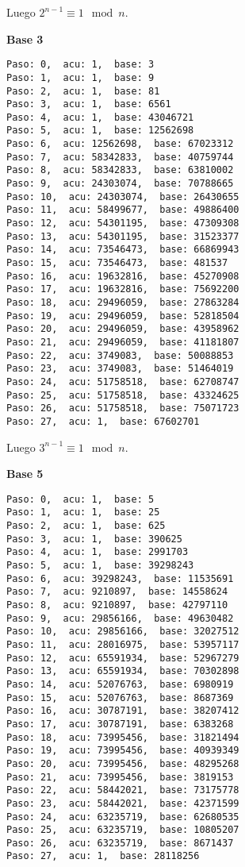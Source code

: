 \documentclass[a4paper]{article}
\begin{document}
Luego $2^{n-1}\equiv 1 \mod n$.


\textbf{Base 3}
\begin{verbatim}
Paso: 0,  acu: 1,  base: 3  
Paso: 1,  acu: 1,  base: 9  
Paso: 2,  acu: 1,  base: 81  
Paso: 3,  acu: 1,  base: 6561  
Paso: 4,  acu: 1,  base: 43046721  
Paso: 5,  acu: 1,  base: 12562698  
Paso: 6,  acu: 12562698,  base: 67023312  
Paso: 7,  acu: 58342833,  base: 40759744  
Paso: 8,  acu: 58342833,  base: 63810002  
Paso: 9,  acu: 24303074,  base: 70788665  
Paso: 10,  acu: 24303074,  base: 26430655  
Paso: 11,  acu: 58499677,  base: 49886400  
Paso: 12,  acu: 54301195,  base: 47309308  
Paso: 13,  acu: 54301195,  base: 31523377  
Paso: 14,  acu: 73546473,  base: 66869943  
Paso: 15,  acu: 73546473,  base: 481537  
Paso: 16,  acu: 19632816,  base: 45270908  
Paso: 17,  acu: 19632816,  base: 75692200  
Paso: 18,  acu: 29496059,  base: 27863284  
Paso: 19,  acu: 29496059,  base: 52818504  
Paso: 20,  acu: 29496059,  base: 43958962  
Paso: 21,  acu: 29496059,  base: 41181807  
Paso: 22,  acu: 3749083,  base: 50088853  
Paso: 23,  acu: 3749083,  base: 51464019  
Paso: 24,  acu: 51758518,  base: 62708747  
Paso: 25,  acu: 51758518,  base: 43324625  
Paso: 26,  acu: 51758518,  base: 75071723  
Paso: 27,  acu: 1,  base: 67602701  
\end{verbatim}

Luego $3^{n-1}\equiv 1 \mod n$.


\textbf{Base 5}
\begin{verbatim}
Paso: 0,  acu: 1,  base: 5  
Paso: 1,  acu: 1,  base: 25  
Paso: 2,  acu: 1,  base: 625  
Paso: 3,  acu: 1,  base: 390625  
Paso: 4,  acu: 1,  base: 2991703  
Paso: 5,  acu: 1,  base: 39298243  
Paso: 6,  acu: 39298243,  base: 11535691  
Paso: 7,  acu: 9210897,  base: 14558624  
Paso: 8,  acu: 9210897,  base: 42797110  
Paso: 9,  acu: 29856166,  base: 49630482  
Paso: 10,  acu: 29856166,  base: 32027512  
Paso: 11,  acu: 28016975,  base: 53957117  
Paso: 12,  acu: 65591934,  base: 52967279  
Paso: 13,  acu: 65591934,  base: 70302898  
Paso: 14,  acu: 52076763,  base: 6980919  
Paso: 15,  acu: 52076763,  base: 8687369  
Paso: 16,  acu: 30787191,  base: 38207412  
Paso: 17,  acu: 30787191,  base: 6383268  
Paso: 18,  acu: 73995456,  base: 31821494  
Paso: 19,  acu: 73995456,  base: 40939349  
Paso: 20,  acu: 73995456,  base: 48295268  
Paso: 21,  acu: 73995456,  base: 3819153  
Paso: 22,  acu: 58442021,  base: 73175778  
Paso: 23,  acu: 58442021,  base: 42371599  
Paso: 24,  acu: 63235719,  base: 62680535  
Paso: 25,  acu: 63235719,  base: 10805207  
Paso: 26,  acu: 63235719,  base: 8671437  
Paso: 27,  acu: 1,  base: 28118256  
\end{verbatim}
\end{document}

